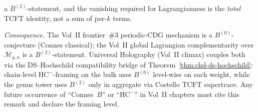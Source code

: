 \begin{remark}
\begin{enumerate}[label=\textup{(\alph*)}]
a $B^{(2)}$-statement, and the vanishing required for
Lagrangianness is the \emph{total} TCFT identity, not a sum of
per-$k$ terms.
\end{enumerate}
\emph{Consequence.} The Vol~II frontier~\#3 periodic-CDG mechanism is a
$B^{(0)}$-conjecture \textup{(}Connes classical\textup{)}; the Vol~II
global Lagrangian complementarity over
$\overline{\mathcal{M}}_{g,n}$ is a $B^{(2)}$-statement. Universal
Holography \textup{(}Vol~II climax\textup{)} couples both via the
DS--Hochschild compatibility bridge of
Theorem~\ref{thm:chd-ds-hochschild}: chain-level
$\mathrm{HC}^-$-framing on the bulk uses $B^{(0)}$
level-wise on each weight, while the genus tower uses $B^{(2)}$
only in aggregate via Costello TCFT supertrace. Any future
occurrence of ``Connes~$B$'' or ``$\mathrm{HC}^-$'' in Vol~II
chapters must cite this remark and declare the framing level.
\end{remark}

